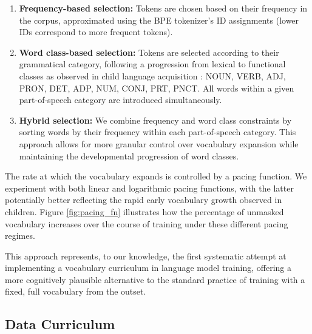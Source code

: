 \begin{enumerate}
    \item \textbf{Frequency-based selection:} Tokens are chosen based on their frequency in the corpus, approximated using the BPE tokenizer's ID assignments (lower IDs correspond to more frequent tokens).
    
    \item \textbf{Word class-based selection:} Tokens are selected according to their grammatical category, following a progression from lexical to functional classes as observed in child language acquisition \cite{bergelson2015early}: NOUN, VERB, ADJ, PRON, DET, ADP, NUM, CONJ, PRT, PNCT. All words within a given part-of-speech category are introduced simultaneously.
    
    \item \textbf{Hybrid selection:} We combine frequency and word class constraints by sorting words by their frequency within each part-of-speech category. This approach allows for more granular control over vocabulary expansion while maintaining the developmental progression of word classes.
\end{enumerate}

The rate at which the vocabulary expands is controlled by a pacing function. We experiment with both linear and logarithmic pacing functions, with the latter potentially better reflecting the rapid early vocabulary growth observed in children. Figure \ref{fig:pacing_fn} illustrates how the percentage of unmasked vocabulary increases over the course of training under these different pacing regimes.

This approach represents, to our knowledge, the first systematic attempt at implementing a vocabulary curriculum in language model training, offering a more cognitively plausible alternative to the standard practice of training with a fixed, full vocabulary from the outset.

\subsection{Data Curriculum}
\label{subsec:data-cl}

